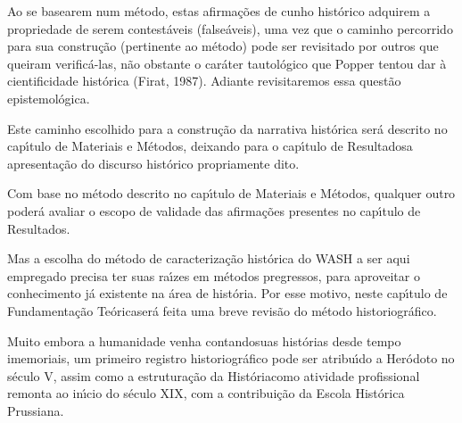 \documentclass[
12pt,		%
openright,	%
twoside,  %
a4paper,			%
chapter=TITLE,		%
english,			%
french,				%
spanish,			%
brazil				%
]{USPSC-classe/USPSC}
\begin{document}
Ao se basearem num m\'etodo, estas afirma\c{c}\~oes de cunho hist\'orico adquirem a propriedade de serem contest\'aveis (false\'aveis), uma vez que o caminho percorrido para sua constru\c{c}\~ao (pertinente ao m\'etodo) pode ser revisitado por outros que queiram verific\'a-las, n\~ao obstante o car\'ater tautol\'ogico que Popper tentou dar \`a cientificidade hist\'orica  (Firat, 1987). Adiante revisitaremos essa quest\~ao epistemol\'ogica.








Este caminho escolhido para a constru\c{c}\~ao da narrativa hist\'orica ser\'a descrito no cap\'{\i}tulo de \textquotedbl Materiais e M\'etodos\textquotedbl , deixando para o cap\'{\i}tulo de \textquotedbl Resultados\textquotedbl  a apresenta\c{c}\~ao do discurso hist\'orico propriamente dito.








Com base no m\'etodo descrito no cap\'{\i}tulo de \textquotedbl Materiais e M\'etodos\textquotedbl , qualquer outro poder\'a avaliar o escopo de validade das afirma\c{c}\~oes presentes no cap\'{\i}tulo de \textquotedbl Resultados\textquotedbl .








Mas a escolha do m\'etodo de caracteriza\c{c}\~ao hist\'orica do WASH a ser aqui empregado precisa ter suas ra\'{\i}zes em m\'etodos pregressos, para aproveitar o conhecimento j\'a existente na \'area de hist\'oria. Por esse motivo, neste cap\'{\i}tulo de \textquotedbl Fundamenta\c{c}\~ao Te\'orica\textquotedbl  ser\'a feita uma breve revis\~ao do m\'etodo historiogr\'afico.








Muito embora a humanidade venha \textquotedbl contando\textquotedbl  suas hist\'orias desde tempo imemoriais, um primeiro registro historiogr\'afico pode ser atribu\'{\i}do a Her\'odoto no s\'eculo V, assim como a estrutura\c{c}\~ao da \textquotedbl Hist\'oria\textquotedbl  como atividade profissional remonta ao in\'{\i}cio do s\'eculo XIX, com a contribui\c{c}\~ao da Escola Hist\'orica Prussiana.
\end{document}
